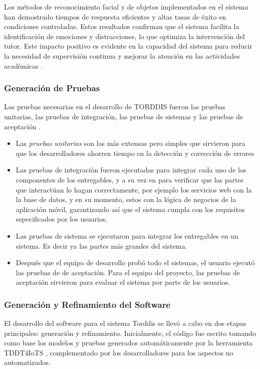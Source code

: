 \documentclass[a4paper,fleqn]{cas-sc}
\begin{document}
				Los métodos de reconocimiento facial y de objetos implementados en el sistema han demostrado tiempos de respuesta eficientes y altas tasas de éxito en condiciones controladas. Estos resultados confirman que el sistema facilita la identificación de emociones y distracciones, lo que optimiza la intervención del tutor. Este impacto positivo es evidente en la capacidad del sistema para reducir la necesidad de supervisión continua y mejorar la atención en las actividades académicas \citep{Deng2024Does,Leiss2024Students}.
				
			\subsubsection{Generación de Pruebas}
				Las pruebas necesarias en el desarrollo de TORDDIS fueron las pruebas unitarias, las pruebas de integración, las pruebas de sistemas y las pruebas de aceptación \citep{Sciarra2024Smash}.
			
				\begin{itemize}
					\item Las \textit{pruebas unitarias} son las más extensas pero simples que sirvieron para que los desarrolladores ahorren tiempo en la detección y corrección de errores \citep{Mafi2024Regression}
					\item Las pruebas de integración fueron ejecutadas para integrar cada uno de los componentes de los entregables, y a su vez en para verificar que las partes que interactúan lo hagan correctamente, por ejemplo los servicios web con la la base de datos, y en su momento, estos con la lógica de negocios de la aplicación móvil, garantizando así que el sistema cumpla con los requisitos especificados por los usuarios.
					\item Las pruebas de sistema se ejecutaron para integrar los entregables en un sistema. Es decir ya las partes más grandes del sistema.
					\item Después que el equipo de desarrollo probó todo el sistemas, el usuario ejecutó las pruebas de de aceptación. Para el equipo del proyecto, las pruebas de aceptación sirvieron para evaluar el sistema por parte de los usuarios.
				\end{itemize}
			
			\subsubsection{Generación y Refinamiento del Software} 
				El desarrollo del software para el sistema Torddis se llevó a cabo en dos etapas principales: generación y refinamiento. Inicialmente, el código fue escrito tomando como base los modelos y pruebas generados automáticamente por la herramienta TDDT4IoTS \citep{Guerrero2024Test}, complementado por los desarrolladores para los aspectos no automatizados. 
			
\end{document}
